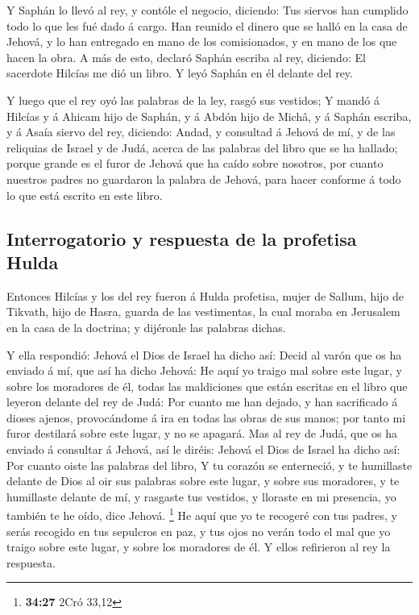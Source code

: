  Y Saphán lo llevó al rey, y contóle el negocio, diciendo:
Tus siervos han cumplido todo lo que les fué dado á cargo. 
Han reunido el dinero que se halló en la casa de Jehová, y lo han
entregado en mano de los comisionados, y en mano de los que hacen la
obra.  A más de esto, declaró Saphán escriba al rey,
diciendo: El sacerdote Hilcías me dió un libro. Y leyó Saphán en él
delante del rey.

 Y luego que el rey oyó las palabras de la ley, rasgó sus
vestidos;  Y mandó á Hilcías y á Ahicam hijo de Saphán, y á
Abdón hijo de Michâ, y á Saphán escriba, y á Asaía siervo del rey,
diciendo:  Andad, y consultad á Jehová de mí, y de las
reliquias de Israel y de Judá, acerca de las palabras del libro que se
ha hallado; porque grande es el furor de Jehová que ha caído sobre
nosotros, por cuanto nuestros padres no guardaron la palabra de Jehová,
para hacer conforme á todo lo que está escrito en este libro.

\hypertarget{interrogatorio-y-respuesta-de-la-profetisa-hulda}{%
\subsection{Interrogatorio y respuesta de la profetisa
Hulda}\label{interrogatorio-y-respuesta-de-la-profetisa-hulda}}

 Entonces Hilcías y los del rey fueron á Hulda profetisa,
mujer de Sallum, hijo de Tikvath, hijo de Hasra, guarda de las
vestimentas, la cual moraba en Jerusalem en la casa de la doctrina; y
dijéronle las palabras dichas.

 Y ella respondió: Jehová el Dios de Israel ha dicho así:
Decid al varón que os ha enviado á mí, que así ha dicho Jehová:
 He aquí yo traigo mal sobre este lugar, y sobre los
moradores de él, todas las maldiciones que están escritas en el libro
que leyeron delante del rey de Judá:  Por cuanto me han
dejado, y han sacrificado á dioses ajenos, provocándome á ira en todas
las obras de sus manos; por tanto mi furor destilará sobre este lugar, y
no se apagará.  Mas al rey de Judá, que os ha enviado á
consultar á Jehová, así le diréis: Jehová el Dios de Israel ha dicho
así: Por cuanto oiste las palabras del libro,  Y tu corazón
se enterneció, y te humillaste delante de Dios al oir sus palabras sobre
este lugar, y sobre sus moradores, y te humillaste delante de mí, y
rasgaste tus vestidos, y lloraste en mi presencia, yo también te he
oído, dice Jehová. \footnote{\textbf{34:27} 2Cró 33,12}  He
aquí que yo te recogeré con tus padres, y serás recogido en tus
sepulcros en paz, y tus ojos no verán todo el mal que yo traigo sobre
este lugar, y sobre los moradores de él. Y ellos refirieron al rey la
respuesta.

